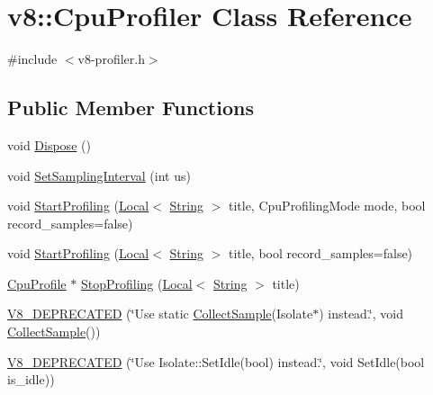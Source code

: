 \hypertarget{classv8_1_1CpuProfiler}{}\section{v8\+:\+:Cpu\+Profiler Class Reference}
\label{classv8_1_1CpuProfiler}


{\ttfamily \#include $<$v8-\/profiler.\+h$>$}

\subsection*{Public Member Functions}
\begin{DoxyCompactItemize}
\item 
void \mbox{\hyperlink{classv8_1_1CpuProfiler_ab49b3f25a897dc6a359571b3014cd225}{Dispose}} ()
\item 
void \mbox{\hyperlink{classv8_1_1CpuProfiler_ac5b05c72fb899e20adfa7f8cc57f21fb}{Set\+Sampling\+Interval}} (int us)
\item 
void \mbox{\hyperlink{classv8_1_1CpuProfiler_a65ff4a18ab14143e094e2ea189facabd}{Start\+Profiling}} (\mbox{\hyperlink{classv8_1_1Local}{Local}}$<$ \mbox{\hyperlink{classv8_1_1String}{String}} $>$ title, Cpu\+Profiling\+Mode mode, bool record\+\_\+samples=false)
\item 
void \mbox{\hyperlink{classv8_1_1CpuProfiler_a7a9b75d3d7285d90344e1b8f14e97076}{Start\+Profiling}} (\mbox{\hyperlink{classv8_1_1Local}{Local}}$<$ \mbox{\hyperlink{classv8_1_1String}{String}} $>$ title, bool record\+\_\+samples=false)
\item 
\mbox{\hyperlink{classv8_1_1CpuProfile}{Cpu\+Profile}} $\ast$ \mbox{\hyperlink{classv8_1_1CpuProfiler_a34acaa3b0e40cf2f92e9e6acb3fb5de7}{Stop\+Profiling}} (\mbox{\hyperlink{classv8_1_1Local}{Local}}$<$ \mbox{\hyperlink{classv8_1_1String}{String}} $>$ title)
\item 
\mbox{\hyperlink{classv8_1_1CpuProfiler_a8ddea26e13e631875cb41dcb2563ff40}{V8\+\_\+\+D\+E\+P\+R\+E\+C\+A\+T\+ED}} (\char`\"{}Use static \mbox{\hyperlink{classv8_1_1CpuProfiler_a88b787078f0c8742b3c077af0de4f46b}{Collect\+Sample}}(Isolate$\ast$) instead.\char`\"{}, void \mbox{\hyperlink{classv8_1_1CpuProfiler_a88b787078f0c8742b3c077af0de4f46b}{Collect\+Sample}}())
\item 
\mbox{\hyperlink{classv8_1_1CpuProfiler_aa5a41d80d7d262f2c171a4382f2fbd4f}{V8\+\_\+\+D\+E\+P\+R\+E\+C\+A\+T\+ED}} (\char`\"{}Use Isolate\+::\+Set\+Idle(bool) instead.\char`\"{}, void Set\+Idle(bool is\+\_\+idle))
\end{DoxyCompactItemize}
